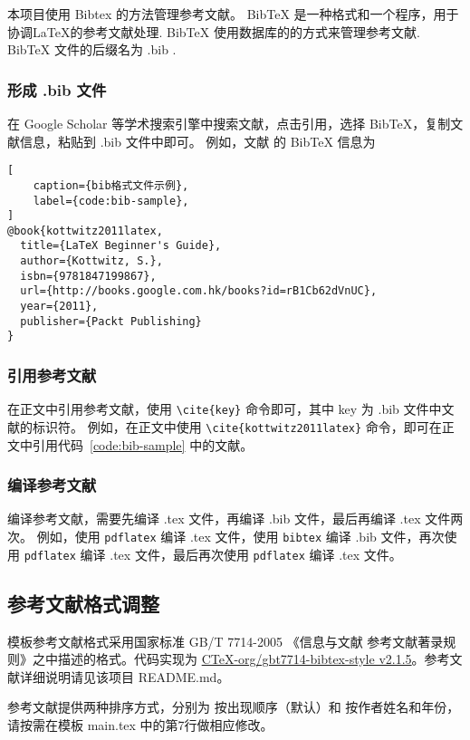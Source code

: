 \documentclass[master,AutoFakeBold=true]{buaathesisproposal}
\begin{document}
本项目使用 Bibtex 的方法管理参考文献。
BibTeX 是一种格式和一个程序，用于协调LaTeX的参考文献处理. BibTeX 使用数据库的的方式来管理参考文献. BibTeX 文件的后缀名为 .bib .

\subsubsection{形成 .bib 文件}

在 Google Scholar 等学术搜索引擎中搜索文献，点击引用，选择 BibTeX，复制文献信息，粘贴到 .bib 文件中即可。
例如，文献 \cite{kottwitz2011latex} 的 BibTeX 信息为
\begin{lstlisting}[
    caption={bib格式文件示例},
    label={code:bib-sample},
]
@book{kottwitz2011latex,
  title={LaTeX Beginner's Guide},
  author={Kottwitz, S.},
  isbn={9781847199867},
  url={http://books.google.com.hk/books?id=rB1Cb62dVnUC},
  year={2011},
  publisher={Packt Publishing}
}
\end{lstlisting}

\subsubsection{引用参考文献}

在正文中引用参考文献，使用 \verb|\cite{key}| 命令即可，其中 key 为 .bib 文件中文献的标识符。
例如，在正文中使用 \verb|\cite{kottwitz2011latex}| 命令，即可在正文中引用代码~\ref{code:bib-sample} 中的文献。

\subsubsection{编译参考文献}

编译参考文献，需要先编译 .tex 文件，再编译 .bib 文件，最后再编译 .tex 文件两次。
例如，使用 \verb|pdflatex| 编译 .tex 文件，使用 \verb|bibtex| 编译 .bib 文件，再次使用 \verb|pdflatex| 编译 .tex 文件，最后再次使用 \verb|pdflatex| 编译 .tex 文件。


\subsection{参考文献格式调整}

模板参考文献格式采用国家标准 GB/T 7714-2005 《信息与文献 参考文献著录规则》之中描述的格式。代码实现为 \href{http://github.com/CTeX-org/gbt7714-bibtex-style/}{CTeX-org/gbt7714-bibtex-style v2.1.5}。参考文献详细说明请见该项目 README.md。

参考文献提供两种排序方式，分别为 按出现顺序（默认）和 按作者姓名和年份，请按需在模板 main.tex 中的第7行做相应修改。
\end{document}
